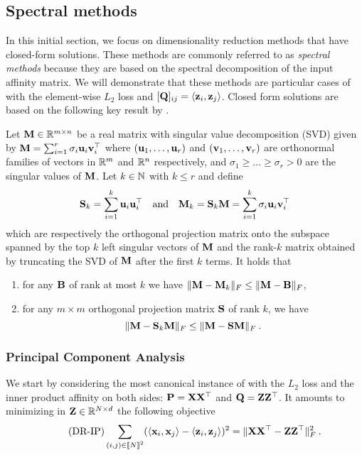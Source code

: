 \subsection{Spectral methods}\label{sec:spectral_methods}

In this initial section, we focus on dimensionality reduction methods that have closed-form solutions. These methods are commonly referred to as \emph{spectral methods} because they are based on the spectral decomposition of the input affinity matrix. We will demonstrate that these methods are particular cases of  with the element-wise $L_2$ loss and $[{\mathbf{Q}}]_{ij} = \langle {\mathbf{z}}_i, {\mathbf{z}}_j \rangle$. Closed form solutions are based on the following key result by \cite{eckart1936approximation}.

\begin{theorem}{\cite{eckart1936approximation}}\label{thm:eckart}
	Let ${\mathbf{M}} \in \mathbb{R}^{m \times n}$ be a real matrix with singular value decomposition (SVD) given by ${\mathbf{M}} = \sum_{i=1}^{r} \sigma_i {\mathbf{u}}_i {\mathbf{v}}_i^\top$ where $({\mathbf{u}}_1, \dots, {\mathbf{u}}_r)$ and $({\mathbf{v}}_1, \dots, {\mathbf{v}}_r)$ are orthonormal families of vectors in $\mathbb{R}^m$ and $\mathbb{R}^n$ respectively, and $\sigma_1 \geq \dots \geq \sigma_r > 0$ are the singular values of ${\mathbf{M}}$. Let $k \in \mathbb{N}$ with $k \leq r$ and define 
	\begin{align}
		{\mathbf{S}}_k = \sum_{i=1}^{k} {\mathbf{u}}_i {\mathbf{u}}_i^\top \quad \text{and} \quad {\mathbf{M}}_k = {\mathbf{S}}_k {\mathbf{M}} = \sum_{i=1}^{k} \sigma_i {\mathbf{u}}_i {\mathbf{v}}_i^\top
	\end{align}
	which are respectively the orthogonal projection matrix onto the subspace spanned by the top $k$ left singular vectors of ${\mathbf{M}}$ and the rank-$k$ matrix obtained by truncating the SVD of ${\mathbf{M}}$ after the first $k$ terms. It holds that
	\begin{enumerate}[label=(\alph*)]
        \item for any ${\mathbf{B}}$ of rank at most $k$ we have $\| {\mathbf{M}} - {\mathbf{M}}_k \|_F \leq \| {\mathbf{M}} - {\mathbf{B}} \|_F$,
        \item for any $m \times m$ orthogonal projection matrix ${\mathbf{S}}$ of rank $k$, we have $$\| {\mathbf{M}} - {\mathbf{S}}_k {\mathbf{M}} \|_F \leq \| {\mathbf{M}} - {\mathbf{S}} {\mathbf{M}} \|_F \: .$$
    \end{enumerate} 
\end{theorem}

\subsubsection{Principal Component Analysis}

We start by considering the most canonical instance of  with the $L_2$ loss and the inner product affinity on both sides: ${\mathbf{P}} = {\mathbf{X}} {\mathbf{X}}^\top$ and ${\mathbf{Q}} = {\mathbf{Z}} {\mathbf{Z}}^\top$. It amounts to minimizing in ${\mathbf{Z}} \in \mathbb{R}^{N \times d}$ the following objective
\begin{equation*}\label{eq:DR_IP}\tag{DR-IP}
	\sum_{(i,j) \in {[\![N]\!]}^2} (\langle {\mathbf{x}}_i, {\mathbf{x}}_j \rangle - \langle {\mathbf{z}}_i, {\mathbf{z}}_j \rangle)^2 = \| {\mathbf{X}} {\mathbf{X}}^\top - {\mathbf{Z}} {\mathbf{Z}}^\top \|_F^2 \:.
\end{equation*}

